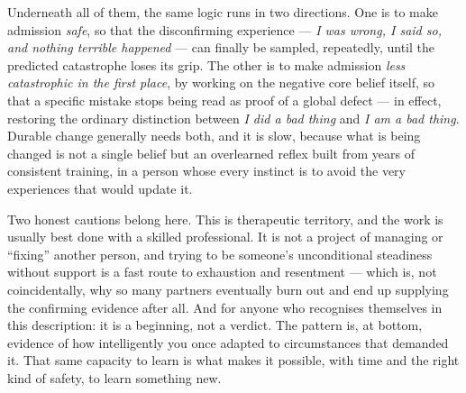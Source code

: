 \documentclass{article}
\begin{document}
Underneath all of them, the same logic runs in two directions. One is to make admission \textit{safe}, so that the disconfirming experience --- \textit{I was wrong, I said so, and nothing terrible happened} --- can finally be sampled, repeatedly, until the predicted catastrophe loses its grip. The other is to make admission \textit{less catastrophic in the first place}, by working on the negative core belief itself, so that a specific mistake stops being read as proof of a global defect --- in effect, restoring the ordinary distinction between \textit{I did a bad thing} and \textit{I am a bad thing}. Durable change generally needs both, and it is slow, because what is being changed is not a single belief but an overlearned reflex built from years of consistent training, in a person whose every instinct is to avoid the very experiences that would update it.

Two honest cautions belong here. This is therapeutic territory, and the work is usually best done with a skilled professional. It is not a project of managing or \enquote{fixing} another person, and trying to be someone's unconditional steadiness without support is a fast route to exhaustion and resentment --- which is, not coincidentally, why so many partners eventually burn out and end up supplying the confirming evidence after all. And for anyone who recognises themselves in this description: it is a beginning, not a verdict. The pattern is, at bottom, evidence of how intelligently you once adapted to circumstances that demanded it. That same capacity to learn is what makes it possible, with time and the right kind of safety, to learn something new.
\end{document}
